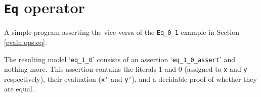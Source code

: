 \section{\texttt{Eq} operator}\label{app:evaln:ops:eq}
    
    
    A simple program asserting the vice-versa of the \texttt{Eq\_0\_1} example in Section \ref{evaln:ops:eq}.
    
    The resulting model `\texttt{eq\_1\_0}' consists of an assertion `\texttt{eq\_1\_0\_assert}' and nothing more. This assertion contains the literals 1 and 0 (assigned to \texttt{x} and \texttt{y} respectively), their evaluation (\texttt{x'} and \texttt{y'}), and a decidable proof of whether they are equal.
